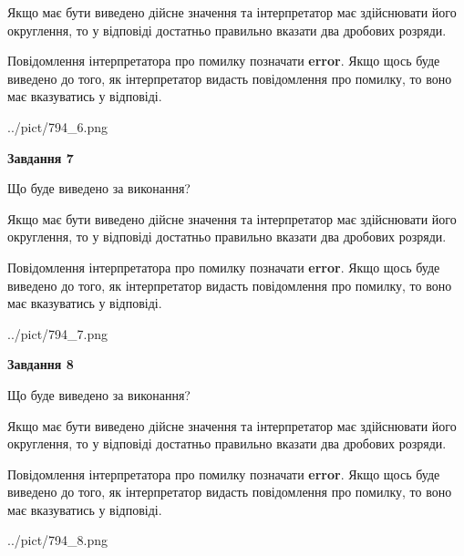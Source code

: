 \documentclass[12pt, ukrainian]{article}
\begin{document}
{\begin {Large}
Якщо має бути виведено дійсне значення та інтерпретатор має здійснювати його округлення, 
то у відповіді достатньо правильно вказати два дробових розряди.

Повідомлення інтерпретатора про помилку позначати \textbf{error}.
Якщо щось буде виведено до того, як інтерпретатор видасть повідомлення про помилку, 
то воно має вказуватись у відповіді. \par

\begin{center}
	{../pict/794_6.png}
\end{center}
\newpage

{\begin {center}\textbf{Завдання 7}\end {center}}\par
Що буде виведено за виконання? \par

Якщо має бути виведено дійсне значення та інтерпретатор має здійснювати його округлення, 
то у відповіді достатньо правильно вказати два дробових розряди.

Повідомлення інтерпретатора про помилку позначати \textbf{error}.
Якщо щось буде виведено до того, як інтерпретатор видасть повідомлення про помилку, 
то воно має вказуватись у відповіді. \par

\begin{center}
	{../pict/794_7.png}
\end{center}
\newpage

{\begin {center}\textbf{Завдання 8}\end {center}}\par
Що буде виведено за виконання? \par

Якщо має бути виведено дійсне значення та інтерпретатор має здійснювати його округлення, 
то у відповіді достатньо правильно вказати два дробових розряди.

Повідомлення інтерпретатора про помилку позначати \textbf{error}.
Якщо щось буде виведено до того, як інтерпретатор видасть повідомлення про помилку, 
то воно має вказуватись у відповіді. \par

\begin{center}
	{../pict/794_8.png}
\end{center}
\newpage


\end{Large}}
\end{document}
